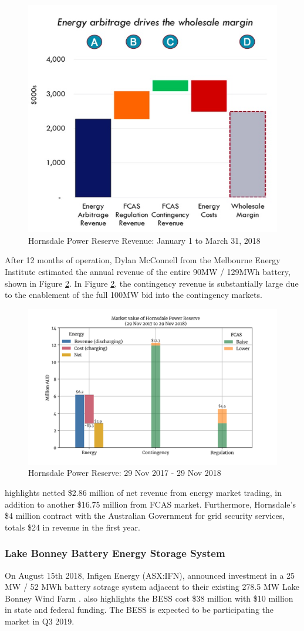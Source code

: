 \begin{figure}[H]
    \centering
    \includegraphics[width=.6\textwidth]{Pictures/Chapter2/hpr_first_3_months.jpg}
    \caption{Hornsdale Power Reserve Revenue: January 1 to March 31, 2018}
    \label{fig:hpr_3_mon_rev}
\end{figure}
After 12 months of operation, Dylan McConnell from the Melbourne Energy Institute estimated the annual revenue of the entire 90MW / 129MWh battery, shown in Figure \ref{fig:hpr_12_mon_rev}. In Figure \ref{fig:hpr_12_mon_rev}, the contingency revenue is substantially large due to the enablement of the full 100MW bid into the contingency markets. 
\begin{figure}[H]
    \centering
    \includegraphics[width=.8\textwidth]{Pictures/Chapter2/hpr_revenue.png}
    \caption{Hornsdale Power Reserve: 29 Nov 2017 - 29 Nov 2018}
    \label{fig:hpr_12_mon_rev}
\end{figure}
\parencite{hornsdale_savings} highlights netted \$2.86 million of net revenue from energy market trading, in addition to another \$16.75 million from FCAS market. Furthermore, Hornsdale's \$4 million contract with the Australian Government for grid security services, totals \$24 in revenue in the first year. 

\subsubsection{ Lake Bonney Battery Energy Storage System }
\label{sec:ifn}
On August 15th 2018, Infigen Energy (ASX:IFN), announced investment in a 25 MW / 52 MWh battery sotrage system adjacent to their existing 278.5 MW Lake Bonney Wind Farm \parencite{IFN_AFR}. \textcite{IFN_AFR} also highlights the BESS cost \$38 million with \$10 million in state and federal funding. The BESS is expected to be participating the market in Q3 2019.
